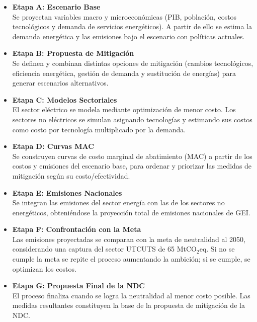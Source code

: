 \begin{itemize}
    \item \textbf{Etapa A: Escenario Base} \\
    Se proyectan variables macro y microeconómicas (PIB, población, costos tecnológicos y demanda de servicios energéticos). A partir de ello se estima la demanda energética y las emisiones bajo el escenario con políticas actuales.

    \item \textbf{Etapa B: Propuesta de Mitigación} \\
    Se definen y combinan distintas opciones de mitigación (cambios tecnológicos, eficiencia energética, gestión de demanda y sustitución de energías) para generar escenarios alternativos.

    \item \textbf{Etapa C: Modelos Sectoriales} \\
    El sector eléctrico se modela mediante optimización de menor costo. Los sectores no eléctricos se simulan asignando tecnologías y estimando sus costos como costo por tecnología multiplicado por la demanda.

    \item \textbf{Etapa D: Curvas MAC} \\
    Se construyen curvas de costo marginal de abatimiento (MAC) a partir de los costos y emisiones del escenario base, para ordenar y priorizar las medidas de mitigación según su costo/efectividad.

    \item \textbf{Etapa E: Emisiones Nacionales} \\
    Se integran las emisiones del sector energía con las de los sectores no energéticos, obteniéndose la proyección total de emisiones nacionales de GEI.

    \item \textbf{Etapa F: Confrontación con la Meta} \\
    Las emisiones proyectadas se comparan con la meta de neutralidad al 2050, considerando una captura del sector UTCUTS de 65 MtCO$_2$eq. Si no se cumple la meta se repite el proceso aumentando la ambición; si se cumple, se optimizan los costos.

    \item \textbf{Etapa G: Propuesta Final de la NDC} \\
    El proceso finaliza cuando se logra la neutralidad al menor costo posible. Las medidas resultantes constituyen la base de la propuesta de mitigación de la NDC.
     
\end{itemize}

